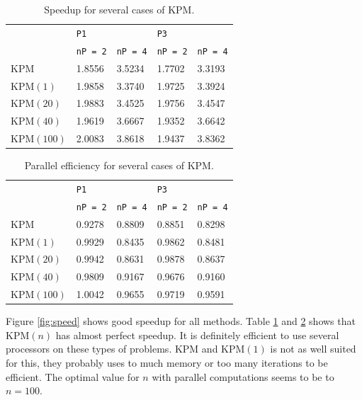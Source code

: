\begin{table}[H]
\centering
\begin{tabular}{l| l l | l l}
&\texttt{P1} & & \texttt{P3} & \\
&\texttt{nP = 2} & \texttt{nP = 4} & \texttt{nP = 2} & \texttt{nP = 4} \\
\hline
KPM & 1.8556  &  3.5234 & 1.7702&    3.3193\\
KPM$(1)$ & 1.9858  &  3.3740 & 1.9725&    3.3924\\
KPM$(20)$ & 1.9883  &  3.4525 & 1.9756&    3.4547\\
KPM$(40)$ & 1.9619  &  3.6667 & 1.9352&   3.6642\\
KPM$(100)$ & 2.0083  &  3.8618 & 1.9437&    3.8362\\
\end{tabular}
\caption{Speedup for several cases of KPM.}
\label{tab:speedup}
\end{table}

\begin{table}[H]
\centering
\begin{tabular}{l|l l| l l}
&\texttt{P1} & & \texttt{P3} & \\
&\texttt{nP = 2} & \texttt{nP = 4} & \texttt{nP = 2} & \texttt{nP = 4} \\
\hline
KPM & 0.9278  &  0.8809 & 0.8851&    0.8298\\
KPM$(1)$ &  0.9929  &  0.8435 & 0.9862 &   0.8481\\
KPM$(20)$ & 0.9942  &  0.8631 & 0.9878&    0.8637\\
KPM$(40)$ & 0.9809  &  0.9167 & 0.9676&    0.9160\\
KPM$(100)$ & 1.0042  &  0.9655 & 0.9719&    0.9591\\
\end{tabular}
\caption{Parallel efficiency for several cases of KPM. }
\label{tab:eff}
\end{table}
Figure \ref{fig:speed} shows good speedup for all methods. Table \ref{tab:speedup} and \ref{tab:eff} shows that KPM$(n)$ has almost perfect speedup. It is definitely efficient to use several processors on these types of problems. KPM and KPM$(1)$ is not as well suited for this, they probably uses to much memory or too many iterations to be efficient. The optimal value for $n$ with parallel computations seems to be to $n = 100$.
